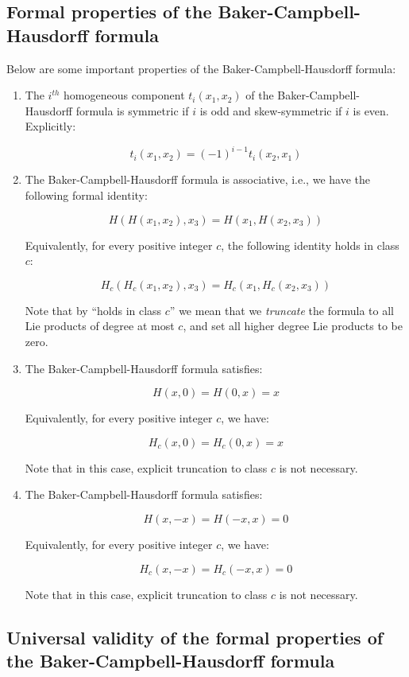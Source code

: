 \subsection{Formal properties of the Baker-Campbell-Hausdorff formula}\label{sec:bch-formal-properties}

Below are some important properties of the Baker-Campbell-Hausdorff
formula:

\begin{enumerate}
\item The $i^{th}$ homogeneous component $t_i(x_1,x_2)$ of the
  Baker-Campbell-Hausdorff formula is symmetric if $i$ is odd and
  skew-symmetric if $i$ is even. Explicitly:

  $$t_i(x_1,x_2) = (-1)^{i-1}t_i(x_2,x_1)$$

\item The Baker-Campbell-Hausdorff formula is associative, i.e., we
  have the following formal identity:

  $$H(H(x_1,x_2),x_3) = H(x_1,H(x_2,x_3))$$

  Equivalently, for every positive integer $c$, the following identity
  holds in class $c$:

  $$H_c(H_c(x_1,x_2),x_3) = H_c(x_1,H_c(x_2,x_3))$$

  Note that by ``holds in class $c$'' we mean that we {\em truncate}
  the formula to all Lie products of degree at most $c$, and set all
  higher degree Lie products to be zero.
\item The Baker-Campbell-Hausdorff formula satisfies:

  $$H(x,0) = H(0,x) = x$$

  Equivalently, for every positive integer $c$, we have:

  $$H_c(x,0) = H_c(0,x) = x$$

  Note that in this case, explicit truncation to class $c$ is not
  necessary.

\item The Baker-Campbell-Hausdorff formula satisfies:

  $$H(x,-x) = H(-x,x) = 0$$

  Equivalently, for every positive integer $c$, we have:

  $$H_c(x,-x) = H_c(-x,x) = 0$$

  Note that in this case, explicit truncation to class $c$ is not
  necessary.
\end{enumerate}

\subsection{Universal validity of the formal properties of the Baker-Campbell-Hausdorff formula}\label{sec:bch-formula-universal-lie-validity}

